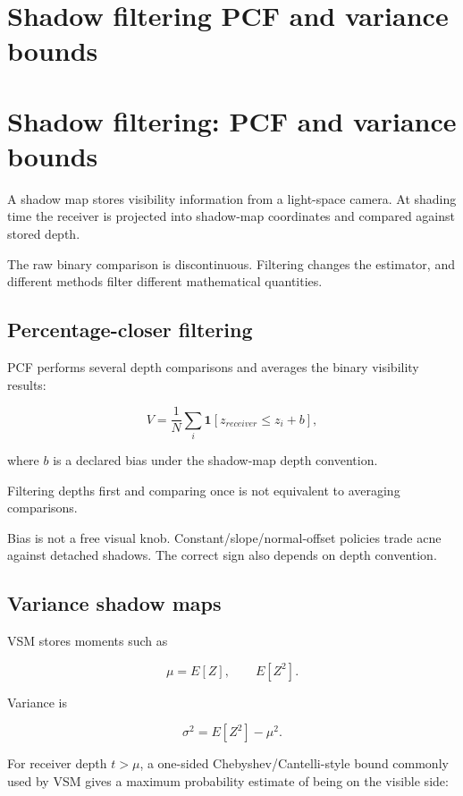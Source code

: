 \hypertarget{appendix-7cac8a689849}{}
\section*{Shadow filtering PCF and variance bounds}
\section{Shadow filtering: PCF and variance bounds}\label{appendix-7cac8a689849-shadow-filtering-pcf-and-variance-bounds}

A shadow map stores visibility information from a light-space camera. At shading time the receiver is projected into shadow-map coordinates and compared against stored depth.

The raw binary comparison is discontinuous. Filtering changes the estimator, and different methods filter different mathematical quantities.

\subsection{Percentage-closer filtering}\label{appendix-7cac8a689849-percentage-closer-filtering}

PCF performs several depth comparisons and averages the binary visibility results:

\[
V=
\frac{1}{N}
\sum_i
\mathbf 1[z_{receiver}\le z_i+b],
\]

where \(b\) is a declared bias under the shadow-map depth convention.

Filtering depths first and comparing once is not equivalent to averaging comparisons.

Bias is not a free visual knob. Constant/slope/normal-offset policies trade acne against detached shadows. The correct sign also depends on depth convention.

\subsection{Variance shadow maps}\label{appendix-7cac8a689849-variance-shadow-maps}

VSM stores moments such as

\[
\mu=E[Z],
\qquad
E[Z^2].
\]

Variance is

\[
\sigma^2=E[Z^2]-\mu^2.
\]

For receiver depth \(t>\mu\), a one-sided Chebyshev/Cantelli-style bound commonly used by VSM gives a maximum probability estimate of being on the visible side:

